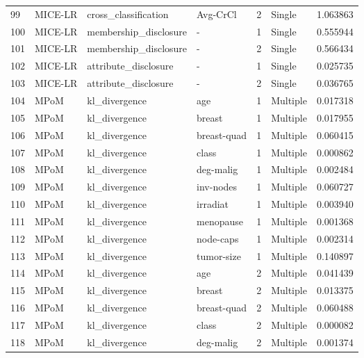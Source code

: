 \begin{tabular}{llllrlr}
99  &  MICE-LR &   cross\_classification &     Avg-CrCl &    2 &    Single &  1.063863 \\
100 &  MICE-LR &  membership\_disclosure &            - &    1 &    Single &  0.555944 \\
101 &  MICE-LR &  membership\_disclosure &            - &    2 &    Single &  0.566434 \\
102 &  MICE-LR &   attribute\_disclosure &            - &    1 &    Single &  0.025735 \\
103 &  MICE-LR &   attribute\_disclosure &            - &    2 &    Single &  0.036765 \\
104 &     MPoM &          kl\_divergence &          age &    1 &  Multiple &  0.017318 \\
105 &     MPoM &          kl\_divergence &       breast &    1 &  Multiple &  0.017955 \\
106 &     MPoM &          kl\_divergence &  breast-quad &    1 &  Multiple &  0.060415 \\
107 &     MPoM &          kl\_divergence &        class &    1 &  Multiple &  0.000862 \\
108 &     MPoM &          kl\_divergence &    deg-malig &    1 &  Multiple &  0.002484 \\
109 &     MPoM &          kl\_divergence &    inv-nodes &    1 &  Multiple &  0.060727 \\
110 &     MPoM &          kl\_divergence &     irradiat &    1 &  Multiple &  0.003940 \\
111 &     MPoM &          kl\_divergence &    menopause &    1 &  Multiple &  0.001368 \\
112 &     MPoM &          kl\_divergence &    node-caps &    1 &  Multiple &  0.002314 \\
113 &     MPoM &          kl\_divergence &   tumor-size &    1 &  Multiple &  0.140897 \\
114 &     MPoM &          kl\_divergence &          age &    2 &  Multiple &  0.041439 \\
115 &     MPoM &          kl\_divergence &       breast &    2 &  Multiple &  0.013375 \\
116 &     MPoM &          kl\_divergence &  breast-quad &    2 &  Multiple &  0.060488 \\
117 &     MPoM &          kl\_divergence &        class &    2 &  Multiple &  0.000082 \\
118 &     MPoM &          kl\_divergence &    deg-malig &    2 &  Multiple &  0.001374 \\

\end{tabular}
